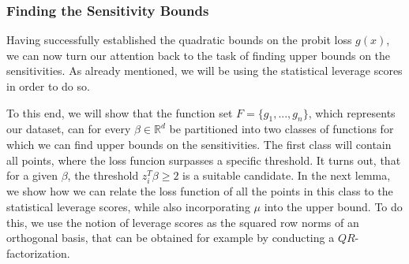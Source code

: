 \subsubsection{Finding the Sensitivity Bounds}

Having successfully established the quadratic bounds on the
probit loss $g(x)$, we can now turn our attention back to the
task of finding upper bounds on the sensitivities.
As already mentioned, we will be using the statistical leverage scores
in order to do so.

To this end, we will show that the function set $F = \{g_1, ..., g_n\}$,
which represents our dataset, can for every
$\beta \in \mathbb{R}^d$ be partitioned into
two classes of functions for which we can find upper bounds
on the sensitivities.
The first class will contain all points, where the loss funcion
surpasses a specific threshold. It turns out, that
for a given $\beta$, the threshold $z_i^T \beta \geq 2$ is a suitable
candidate. In the next lemma, we show how we can relate the
loss function of all the points in this class to the
statistical leverage scores, while also incorporating $\mu$
into the upper bound. To do this, we use the notion of leverage
scores as the squared row norms of an orthogonal basis,
that can be obtained for example by conducting a $QR$-factorization.

